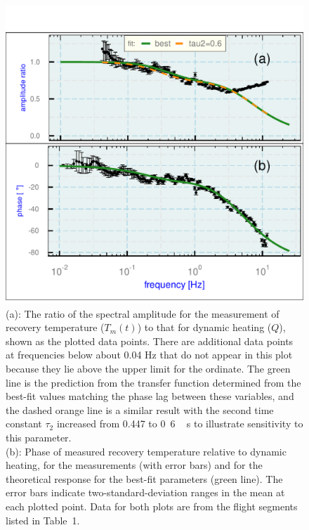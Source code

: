 \documentclass[amt, manuscript]{copernicus}
\begin{document}
\begin{figure}

\begin{center}\includegraphics[width=12cm]{figure/fig2} \end{center}

\caption[Phase and amplitude ratio (or gain) for the measured recovery temperature
relative to dynamic heating.]{(a): The ratio of the spectral amplitude for the measurement
of recovery temperature ($T_{m}(t)$) to that for dynamic heating
($Q$), shown as the plotted data points. There are additional data
points at frequencies below about 0.04 Hz that do not appear in this
plot because they lie above the upper limit for the ordinate. The
green line is the prediction from the transfer function determined
from the best-fit values matching the phase lag between these variables,
and the dashed orange line is a similar result with the second time
constant $\tau_{2}$ increased from 0.447 to \unit{0.6\,s} to illustrate
sensitivity to this parameter.\protect \\
(b): Phase of measured recovery temperature relative to dynamic
heating, for the measurements (with error bars) and for the theoretical
response for the best-fit parameters (green line). The error bars
indicate two-standard-deviation ranges in the mean at each plotted
point. Data for both plots are from the  flight segments listed in Table\ 1.
{\label{fig:Vphase}}}
\end{figure}
\end{document}
